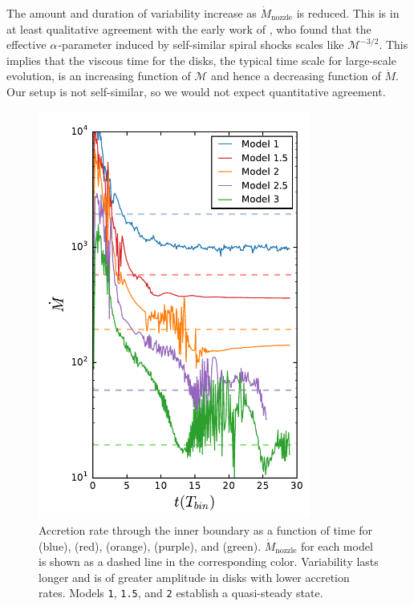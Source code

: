 The amount and duration of variability increase as $\dot{M}_\text{nozzle}$ is reduced.  This is in at least qualitative agreement with the early work of \cite{Spruit87}, who found that the effective $\alpha$-parameter induced by self-similar spiral shocks scales like $\mathcal{M}^{-3/2}$.  This implies that the viscous time for the disks, the typical time scale for large-scale evolution, is an increasing function of $\mathcal{M}$ and hence a decreasing function of $\dot{M}$.  Our setup is not self-similar, so we would not expect quantitative agreement.

\begin{figure}
\begin{center}
\includegraphics[width=0.8\textwidth]{figures/minidisk/mdot_all.pdf}
\end{center}
\caption{ Accretion rate through the inner boundary as a function of time for  (blue),  (red),  (orange),  (purple), and  (green).  $\dot{M}_\text{nozzle}$ for each model is shown as a dashed line in the corresponding color. Variability lasts longer and is of greater amplitude in disks with lower accretion rates.  Models \texttt{1}, \texttt{1.5}, and \texttt{2} establish a quasi-steady state.}
\end{figure}

